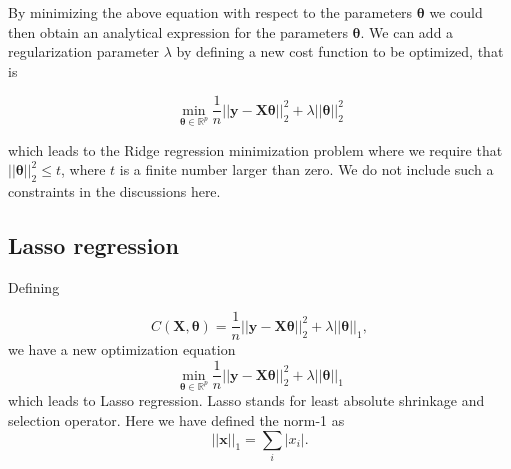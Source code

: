 \documentclass[%
oneside,                 %
final,                   %
10pt]{article}
\begin{document}
By minimizing the above equation with respect to the parameters
$\bm{\theta}$ we could then obtain an analytical expression for the
parameters $\bm{\theta}$.  We can add a regularization parameter $\lambda$ by
defining a new cost function to be optimized, that is

\[
{\displaystyle \min_{\bm{\theta}\in
{\mathbb{R}}^{p}}}\frac{1}{n}\vert\vert \bm{y}-\bm{X}\bm{\theta}\vert\vert_2^2+\lambda\vert\vert \bm{\theta}\vert\vert_2^2
\]

which leads to the Ridge regression minimization problem where we
require that $\vert\vert \bm{\theta}\vert\vert_2^2\le t$, where $t$ is
a finite number larger than zero. We do not include such a constraints in the discussions here.

\subsection{Lasso regression}

Defining

\[
C(\bm{X},\bm{\theta})=\frac{1}{n}\vert\vert \bm{y}-\bm{X}\bm{\theta}\vert\vert_2^2+\lambda\vert\vert \bm{\theta}\vert\vert_1,
\]
we have a new optimization equation
\[
{\displaystyle \min_{\bm{\theta}\in
{\mathbb{R}}^{p}}}\frac{1}{n}\vert\vert \bm{y}-\bm{X}\bm{\theta}\vert\vert_2^2+\lambda\vert\vert \bm{\theta}\vert\vert_1
\]
which leads to Lasso regression. Lasso stands for least absolute shrinkage and selection operator. 
Here we have defined the norm-1 as 
\[
\vert\vert \bm{x}\vert\vert_1 = \sum_i \vert x_i\vert. 
\]

\end{document}
